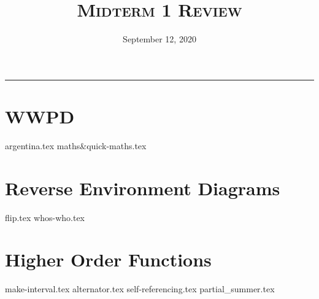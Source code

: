 \documentclass{exam}
\title{\textsc{Midterm 1 Review}}
\date{September 12, 2020}
\begin{document}
\maketitle
\rule{\textwidth}{0.15em}
\fontsize{12}{15}\selectfont


\section{WWPD}
\begin{questions}
{argentina.tex}
{maths&quick-maths.tex}
\end{questions}

\newpage
\section{Reverse Environment Diagrams}
\begin{questions}
{flip.tex}
\newpage
{whos-who.tex}
\end{questions}

\newpage
\section{Higher Order Functions}
\begin{questions}
{make-interval.tex}
{alternator.tex}
{self-referencing.tex}
{partial_summer.tex}
\end{questions}
\end{document}
